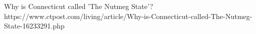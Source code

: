




Why is Connecticut called 'The Nutmeg State'?
https://www.ctpost.com/living/article/Why-is-Connecticut-called-The-Nutmeg-State-16233291.php
